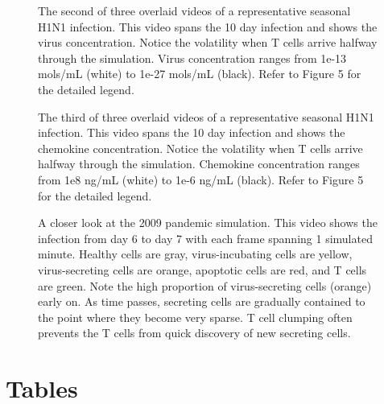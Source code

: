 \documentclass[preprint,10pt,authoryear]{article}
\begin{document}
\begin{figure}[ht!]
\caption{The second of three overlaid videos of a representative seasonal H1N1 infection.  This video spans the 10 day infection and shows the virus concentration.  Notice the volatility when T cells arrive halfway through the simulation.  Virus concentration ranges from 1e-13 mols/mL (white) to 1e-27 mols/mL (black).  Refer to Figure 5 for the detailed legend. } 
 \label{video:virus_view}
\end{figure}

\begin{figure}[ht!]
\caption{The third of three overlaid videos of a representative seasonal H1N1 infection.  This video spans the 10 day infection and shows the chemokine concentration.  Notice the volatility when T cells arrive halfway through the simulation.  Chemokine concentration ranges from 1e8 ng/mL (white) to 1e-6 ng/mL (black).  Refer to Figure 5 for the detailed legend. } 
 \label{video:chemokine_view}
\end{figure}

\begin{figure}[ht!]
\caption{A closer look at the 2009 pandemic simulation.  This video shows the infection from day 6 to day 7 with each frame spanning 1 simulated minute.  Healthy cells are gray, virus-incubating cells are yellow, virus-secreting cells are orange, apoptotic cells are red, and T cells are green.  Note the high proportion of virus-secreting cells (orange) early on.  As time passes, secreting cells are gradually contained to the point where they become very sparse.  T cell clumping often prevents the T cells from quick discovery of new secreting cells.}
\end{figure}

\pagebreak

\section*{Tables}


\renewcommand{\thetable}{S\arabic{table}}
\end{document}
